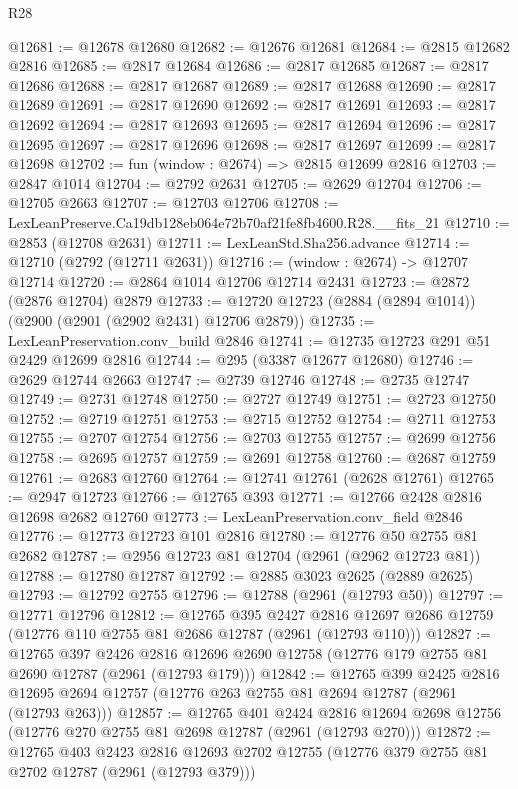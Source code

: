 \begin{lexlean}{R28}
\begin{coremodule}
@12681 := @12678 @12680
@12682 := @12676 @12681
@12684 := @2815 @12682 @2816
@12685 := @2817 @12684
@12686 := @2817 @12685
@12687 := @2817 @12686
@12688 := @2817 @12687
@12689 := @2817 @12688
@12690 := @2817 @12689
@12691 := @2817 @12690
@12692 := @2817 @12691
@12693 := @2817 @12692
@12694 := @2817 @12693
@12695 := @2817 @12694
@12696 := @2817 @12695
@12697 := @2817 @12696
@12698 := @2817 @12697
@12699 := @2817 @12698
@12702 := fun (window : @2674) => @2815 @12699 @2816
@12703 := @2847 @1014
@12704 := @2792 @2631
@12705 := @2629 @12704
@12706 := @12705 @2663
@12707 := @12703 @12706
@12708 := LexLeanPreserve.Ca19db128eb064e72b70af21fe8fb4600.R28.__fits_21
@12710 := @2853 (@12708 @2631)
@12711 := LexLeanStd.Sha256.advance
@12714 := @12710 (@2792 (@12711 @2631))
@12716 := (window : @2674) -> @12707 @12714
@12720 := @2864 @1014 @12706 @12714 @2431
@12723 := @2872 (@2876 @12704) @2879
@12733 := @12720 @12723 (@2884 (@2894 @1014)) (@2900 (@2901 (@2902 @2431) @12706 @2879))
@12735 := LexLeanPreservation.conv_build @2846
@12741 := @12735 @12723 @291 @51 @2429 @12699 @2816
@12744 := @295 (@3387 @12677 @12680)
@12746 := @2629 @12744 @2663
@12747 := @2739 @12746
@12748 := @2735 @12747
@12749 := @2731 @12748
@12750 := @2727 @12749
@12751 := @2723 @12750
@12752 := @2719 @12751
@12753 := @2715 @12752
@12754 := @2711 @12753
@12755 := @2707 @12754
@12756 := @2703 @12755
@12757 := @2699 @12756
@12758 := @2695 @12757
@12759 := @2691 @12758
@12760 := @2687 @12759
@12761 := @2683 @12760
@12764 := @12741 @12761 (@2628 @12761)
@12765 := @2947 @12723
@12766 := @12765 @393
@12771 := @12766 @2428 @2816 @12698 @2682 @12760
@12773 := LexLeanPreservation.conv_field @2846
@12776 := @12773 @12723 @101 @2816
@12780 := @12776 @50 @2755 @81 @2682
@12787 := @2956 @12723 @81 @12704 (@2961 (@2962 @12723 @81))
@12788 := @12780 @12787
@12792 := @2885 @3023 @2625 (@2889 @2625)
@12793 := @12792 @2755
@12796 := @12788 (@2961 (@12793 @50))
@12797 := @12771 @12796
@12812 := @12765
    @395
    @2427
    @2816
    @12697
    @2686
    @12759
    (@12776 @110 @2755 @81 @2686 @12787 (@2961 (@12793 @110)))
@12827 := @12765
    @397
    @2426
    @2816
    @12696
    @2690
    @12758
    (@12776 @179 @2755 @81 @2690 @12787 (@2961 (@12793 @179)))
@12842 := @12765
    @399
    @2425
    @2816
    @12695
    @2694
    @12757
    (@12776 @263 @2755 @81 @2694 @12787 (@2961 (@12793 @263)))
@12857 := @12765
    @401
    @2424
    @2816
    @12694
    @2698
    @12756
    (@12776 @270 @2755 @81 @2698 @12787 (@2961 (@12793 @270)))
@12872 := @12765
    @403
    @2423
    @2816
    @12693
    @2702
    @12755
    (@12776 @379 @2755 @81 @2702 @12787 (@2961 (@12793 @379)))

\end{coremodule}
\end{lexlean}
